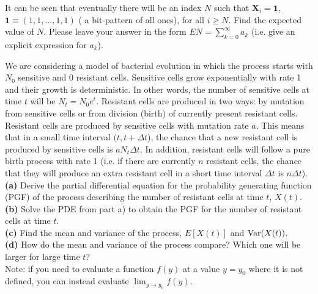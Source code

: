 \documentclass[10pt]{amsart}
\begin{document}
\noindent It can be seen that eventually there will be an index $N$ such that ${\bm X}_i={\bm 1}$, ${\bm 1}\equiv(1,1,...,1,1)$ ( a bit-pattern of all ones), for all $i\geq N$. Find the expected value of $N$. Please leave your answer in the form $EN=\sum_{k=0}^{\infty} a_k$ (i.e. give an explicit expression for $a_k$).
\\ 

\newpage


 We are considering a model of bacterial evolution in which the process starts with $N_0$ sensitive and 0 resistant cells. Sensitive cells grow exponentially with rate 1 and their growth is deterministic. In other words, the number of sensitive cells at time $t$ will be $N_t=N_0 e^t$. Resistant cells are produced in two ways:  by mutation from sensitive cells or from division (birth) of currently present resistant cells. Resistant cells are produced by sensitive cells with mutation rate $a$. This means that in a small time interval $(t,t+\Delta t$), the chance that a new resistant cell is produced by sensitive cells is $a N_t \Delta t$. In addition, resistant cells will follow a pure birth process with rate 1 (i.e. if there are currently $n$ resistant cells, the chance that they will produce an extra resistant cell in a short time interval $\Delta t$ is $n\Delta t$). 
\\

\noindent
{\bf (a)} Derive the partial differential equation for the probability generating function (PGF) of the process describing the number of resistant cells at time $t$, $X(t)$.\\

\noindent
{\bf (b)} Solve the PDE from part a) to obtain the PGF for the number of resistant cells at time $t$.
\\

\noindent
{\bf (c)} Find the mean and variance of the process, $E[X(t)]$ and ${\rm Var}(X(t))$.
\\

\noindent
{\bf (d)} How do the mean and variance of the process compare? Which one will be larger for large time $t$?
\\

Note: if you need to evaluate a function $f(y)$ at a value $y=y_0$ where it is not defined, you can instead evaluate $\lim_{y\to y_0} f(y)$.
\end{document}
